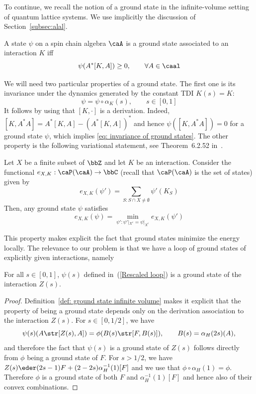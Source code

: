 To continue, we recall the notion of a ground state in the infinite-volume setting of quantum lattice systems. We use implicitly the discussion of Section~\ref{subsec:alal}.
\begin{definition}\label{def: ground state infinite volume}
	A state $\psi$ on a spin chain algebra $\caA$ is a ground state associated to an interaction $K$ iff\
	$$
	\psi(A^*[K,A]) \geq 0,\qquad \forall A \in \caal
	$$
\end{definition}
We will need two particular properties of a ground state. The first one is its invariance under the dynamics generated by the constant TDI $K(s)=K$:
\begin{equation}\label{eq: invariance of ground states}
	\psi=\psi\circ\alpha_K(s), \qquad s\in [0,1]
\end{equation}
It follows by using that $[K,\cdot]$ is a derivation. Indeed, $[K,A^*A]=  A^*[K,A] - (A^*[K,A])^*$
and hence $\psi([K,A^*A])=0$ for a ground state $\psi$, which implies \eqref{eq: invariance of ground states}. The other property is the following variational statement, see Theorem~6.2.52 in~\cite{BratRob2}.
\begin{lemma}\label{lem: variational principle}
	Let $X$ be a finite subset of $\bbZ$ and let $K$ be an interaction. Consider the functional  $e_{X,K}:\caP(\caA)\to \bbC$ (recall that $\caP(\caA)$ is the set of states) given by
	$$e_{X,K}(\psi')= \sum_{S: S \cap X \neq \emptyset} \psi'(K_S)$$ 
	Then, any ground state $\psi$ satisfies
	$$
	e_{X,K}(\psi)=\min_{\psi':\psi'|_{X^c}=\psi|_{X^c} }  e_{X,K}(\psi')
	$$
\end{lemma}
This property makes explicit the fact that ground states minimize the energy locally. 
The relevance to our problem is that we have a loop of ground states of explicitly given  interactions, namely
\begin{lemma}
	For all $s\in[0,1]$,  $\psi(s)$ defined in~(\ref{Rescaled loop}) is a ground state of the interaction $Z(s)$. 
\end{lemma}
\begin{proof}
	Definition~\ref{def: ground state infinite volume} makes it explicit that the property of being a ground state depends only on the derivation association to the interaction $Z(s)$.  For  $s \in [0,1/2] $, we have $$\psi(s)(A\str[Z(s),A]) = \phi(B(s)\str[F,B(s)]),\qquad B(s) = \alpha_H(2s)(A),$$ and therefore the fact that $\psi(s)$ is a ground state of $Z(s)$ follows directly from $\phi$ being a ground state of $F$.  For $s>1/2$, we have $Z(s) \eder (2s-1)F+    (2-2s)\alpha^{-1}_H(1)[F]$ and we use that $\phi\circ\alpha_H(1)=\phi$. Therefore $\phi$ is a ground state of both $F$ and     $\alpha_H^{-1}(1)[F]$ and hence also of their convex combinations. 
\end{proof}

